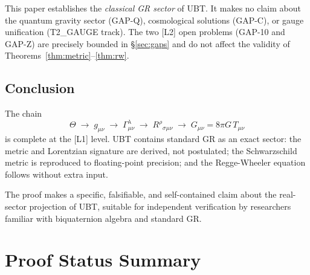 \documentclass[12pt,a4paper]{article}
\theoremstyle{definition}
\theoremstyle{remark}
\begin{document}
This paper establishes the \emph{classical GR sector} of UBT.
It makes no claim about the quantum gravity sector (GAP-Q),
cosmological solutions (GAP-C), or gauge unification (T2\_GAUGE track).
The two [L2] open problems (GAP-10 and GAP-Z) are precisely bounded in
\S\ref{sec:gaps} and do not affect the validity of Theorems~\ref{thm:metric}--\ref{thm:rw}.

\subsection{Conclusion}

The chain
\[
  \Theta \;\longrightarrow\;
  g_{\mu\nu} \;\longrightarrow\;
  \Gamma^\lambda_{\mu\nu} \;\longrightarrow\;
  R^\rho{}_{\sigma\mu\nu} \;\longrightarrow\;
  G_{\mu\nu} = 8\pi G\,T_{\mu\nu}
\]
is complete at the [L1] level.
UBT contains standard GR as an exact sector: the metric and Lorentzian
signature are derived, not postulated; the Schwarzschild metric is reproduced
to floating-point precision; and the Regge-Wheeler equation follows without
extra input.

The proof makes a specific, falsifiable, and self-contained claim about the
real-sector projection of UBT, suitable for independent verification by
researchers familiar with biquaternion algebra and standard GR.

\section{Proof Status Summary}
\label{sec:summary}
\end{document}
